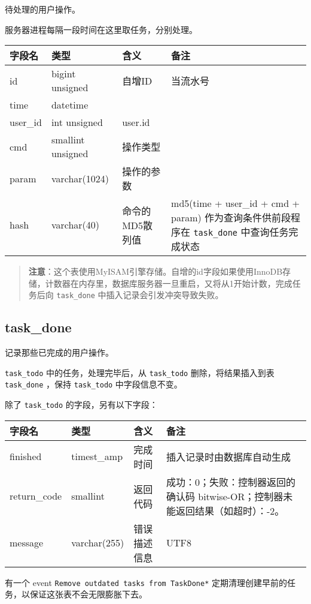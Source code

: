 待处理的用户操作。

服务器进程每隔一段时间在这里取任务，分别处理。

\begin{longtabu}[c]{@{}lXXX@{}}
\toprule
字段名 & 类型 & 含义 & 备注\tabularnewline
\midrule
\endhead
id & bigint unsigned & 自增ID & 当流水号\tabularnewline
time & datetime & &\tabularnewline
user\_id & int unsigned & user.id &\tabularnewline
cmd & smallint unsigned & 操作类型 &\tabularnewline
param & varchar(1024) & 操作的参数 &\tabularnewline
hash & varchar(40) & 命令的MD5散列值 & md5(time + user\_id + cmd +
param) 作为查询条件供前段程序在 \texttt{task\_done}
中查询任务完成状态\tabularnewline
\bottomrule
\end{longtabu}

\begin{quote}
\textbf{注意}：这个表使用MyISAM引擎存储。自增的id字段如果使用InnoDB存储，计数器在内存里，数据库服务器一旦重启，又将从1开始计数，完成任务后向
\texttt{task\_done} 中插入记录会引发冲突导致失败。
\end{quote}

\subsection{task\_done}\label{taskux5fdone}

记录那些已完成的用户操作。

\texttt{task\_todo} 中的任务，处理完毕后，从 \texttt{task\_todo}
删除，将结果插入到表 \texttt{task\_done} ，保持 \texttt{task\_todo}
中字段信息不变。

除了 \texttt{task\_todo} 的字段，另有以下字段：

\begin{longtabu}[c]{@{}lXXX@{}}
\toprule
字段名 & 类型 & 含义 & 备注\tabularnewline
\midrule
\endhead
finished & timest\_amp & 完成时间 &
插入记录时由数据库自动生成\tabularnewline
return\_code & smallint & 返回代码 & 成功：0；失败：控制器返回的确认码
bitwise-OR；控制器未能返回结果（如超时）：-2。\tabularnewline
message & varchar(255) & 错误描述信息 & UTF8\tabularnewline
\bottomrule
\end{longtabu}

有一个 event \texttt{Remove outdated tasks from TaskDone*}
定期清理创建早前的任务，以保证这张表不会无限膨胀下去。
